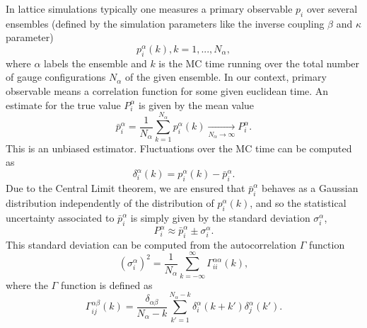 In lattice simulations typically one measures a primary observable $p_i$ over several ensembles (defined by the simulation parameters like the inverse coupling $\beta$ and $\kappa$ parameter) 
\begin{equation}
p_i^{\alpha}(k), k=1,...,N_{\alpha},
\end{equation}
where $\alpha$ labels the ensemble and $k$ is the MC time running over the total number of gauge configurations $N_{\alpha}$ of the given ensemble. In our context, primary observable means a correlation function for some given euclidean time. An estimate for the true value $P_i^{\alpha}$ is given by the mean value
\begin{equation}
\bar{p}_i^{\alpha}=\frac{1}{N_{\alpha}}\sum_{k=1}^{N_{\alpha}}p_i^{\alpha}(k)\xrightarrow[N_{\alpha}\rightarrow\infty]{}P_i^{\alpha}.
\end{equation}
This is an unbiased estimator. Fluctuations over the MC time can be computed as
\begin{equation}
\delta_i^{\alpha}(k)=p_i^{\alpha}(k)-\bar{p}_i^{\alpha}.
\end{equation}
Due to the Central Limit theorem, we are ensured that $\bar{p}_i^{\alpha}$ behaves as a Gaussian distribution independently of the distribution of $p_i^{\alpha}(k)$, and so the statistical uncertainty associated to $\bar{p}_i^{\alpha}$ is simply given by the standard deviation $\sigma_i^{\alpha}$,
\begin{equation}
P_i^{\alpha}\approx\bar{p}_i^{\alpha}\pm\sigma_i^{\alpha}.
\end{equation}
This standard deviation can be computed from the autocorrelation $\Gamma$ function
\begin{equation}
(\sigma_i^{\alpha})^2=\frac{1}{N_{\alpha}}\sum_{k=-\infty}^{\infty}\Gamma_{ii}^{\alpha\alpha}(k),
\end{equation}
where the $\Gamma$ function is defined as
\begin{equation}
\Gamma_{ij}^{\alpha\beta}(k)=\frac{\delta_{\alpha\beta}}{N_{\alpha}-k}\sum_{k'=1}^{N_{\alpha}-k}\delta_i^{\alpha}(k+k')\delta_j^{\alpha}(k').
\end{equation}

